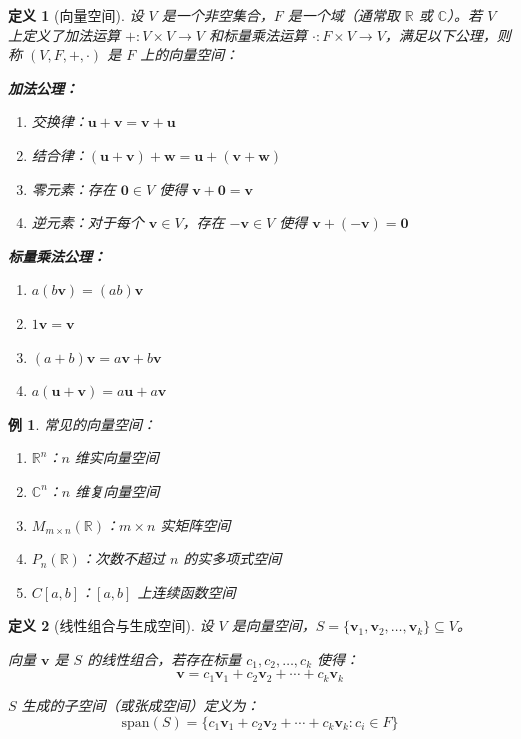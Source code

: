 \documentclass[12pt]{article}
\newtheorem{definition}{定义}[section]
\newtheorem{example}{例}[section]
\begin{document}
\begin{definition}[向量空间]
设 $V$ 是一个非空集合，$F$ 是一个域（通常取 $\mathbb{R}$ 或 $\mathbb{C}$）。若 $V$ 上定义了加法运算 $+: V \times V \to V$ 和标量乘法运算 $\cdot: F \times V \to V$，满足以下公理，则称 $(V, F, +, \cdot)$ 是 $F$ 上的向量空间：

\textbf{加法公理：}
\begin{enumerate}
\item 交换律：$\mathbf{u} + \mathbf{v} = \mathbf{v} + \mathbf{u}$
\item 结合律：$(\mathbf{u} + \mathbf{v}) + \mathbf{w} = \mathbf{u} + (\mathbf{v} + \mathbf{w})$
\item 零元素：存在 $\mathbf{0} \in V$ 使得 $\mathbf{v} + \mathbf{0} = \mathbf{v}$
\item 逆元素：对于每个 $\mathbf{v} \in V$，存在 $-\mathbf{v} \in V$ 使得 $\mathbf{v} + (-\mathbf{v}) = \mathbf{0}$
\end{enumerate}

\textbf{标量乘法公理：}
\begin{enumerate}
\item $a(b\mathbf{v}) = (ab)\mathbf{v}$
\item $1\mathbf{v} = \mathbf{v}$
\item $(a + b)\mathbf{v} = a\mathbf{v} + b\mathbf{v}$
\item $a(\mathbf{u} + \mathbf{v}) = a\mathbf{u} + a\mathbf{v}$
\end{enumerate}
\end{definition}

\begin{example}
常见的向量空间：
\begin{enumerate}
\item $\mathbb{R}^n$：$n$ 维实向量空间
\item $\mathbb{C}^n$：$n$ 维复向量空间
\item $M_{m \times n}(\mathbb{R})$：$m \times n$ 实矩阵空间
\item $P_n(\mathbb{R})$：次数不超过 $n$ 的实多项式空间
\item $C[a, b]$：$[a, b]$ 上连续函数空间
\end{enumerate}
\end{example}

\begin{definition}[线性组合与生成空间]
设 $V$ 是向量空间，$S = \{\mathbf{v}_1, \mathbf{v}_2, \ldots, \mathbf{v}_k\} \subseteq V$。

向量 $\mathbf{v}$ 是 $S$ 的线性组合，若存在标量 $c_1, c_2, \ldots, c_k$ 使得：
$$\mathbf{v} = c_1\mathbf{v}_1 + c_2\mathbf{v}_2 + \cdots + c_k\mathbf{v}_k$$

$S$ 生成的子空间（或张成空间）定义为：
$$\text{span}(S) = \{c_1\mathbf{v}_1 + c_2\mathbf{v}_2 + \cdots + c_k\mathbf{v}_k : c_i \in F\}$$
\end{definition}
\end{document}
